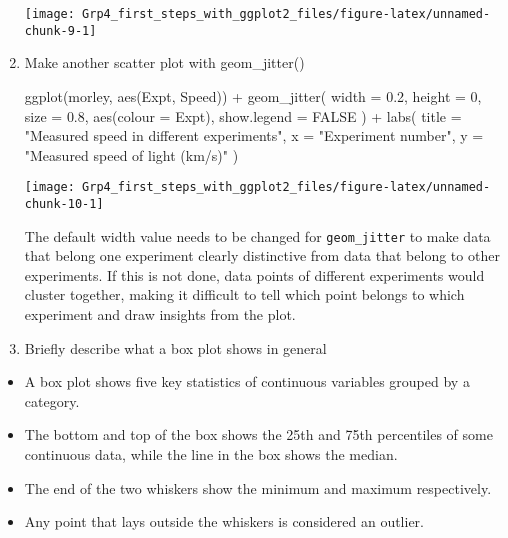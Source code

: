 \documentclass[
]{article}
\newenvironment{Shaded}{\begin{snugshade}}{\end{snugshade}}
\newcommand{\AttributeTok}[1]{\textcolor[rgb]{0.77,0.63,0.00}{#1}}
\newcommand{\ConstantTok}[1]{\textcolor[rgb]{0.00,0.00,0.00}{#1}}
\newcommand{\DecValTok}[1]{\textcolor[rgb]{0.00,0.00,0.81}{#1}}
\newcommand{\FloatTok}[1]{\textcolor[rgb]{0.00,0.00,0.81}{#1}}
\newcommand{\FunctionTok}[1]{\textcolor[rgb]{0.00,0.00,0.00}{#1}}
\newcommand{\NormalTok}[1]{#1}
\newcommand{\SpecialCharTok}[1]{\textcolor[rgb]{0.00,0.00,0.00}{#1}}
\newcommand{\StringTok}[1]{\textcolor[rgb]{0.31,0.60,0.02}{#1}}
\providecommand{\tightlist}{%
  \setlength{\itemsep}{0pt}\setlength{\parskip}{0pt}}
\begin{document}
\begin{enumerate}
  \begin{center}\texttt{[image: Grp4\_first\_steps\_with\_ggplot2\_files/figure-latex/unnamed-chunk-9-1]} \end{center}
\item
  Make another scatter plot with geom\_jitter()

\begin{Shaded}
\begin{Highlighting}[]
  \FunctionTok{ggplot}\NormalTok{(morley, }\FunctionTok{aes}\NormalTok{(Expt, Speed)) }\SpecialCharTok{+}
\FunctionTok{geom\_jitter}\NormalTok{(}
  \AttributeTok{width =} \FloatTok{0.2}\NormalTok{,}
  \AttributeTok{height =} \DecValTok{0}\NormalTok{,}
  \AttributeTok{size =} \FloatTok{0.8}\NormalTok{,}
  \FunctionTok{aes}\NormalTok{(}\AttributeTok{colour =}\NormalTok{ Expt),}
  \AttributeTok{show.legend =} \ConstantTok{FALSE}
\NormalTok{) }\SpecialCharTok{+}
\FunctionTok{labs}\NormalTok{(}
  \AttributeTok{title =} \StringTok{"Measured speed in different experiments"}\NormalTok{,}
  \AttributeTok{x =} \StringTok{"Experiment number"}\NormalTok{,}
  \AttributeTok{y =} \StringTok{"Measured speed of light (km/s)"}
\NormalTok{)}
\end{Highlighting}
\end{Shaded}

  \begin{center}\texttt{[image: Grp4\_first\_steps\_with\_ggplot2\_files/figure-latex/unnamed-chunk-10-1]} \end{center}

  The default width value needs to be changed for \texttt{geom\_jitter}
  to make data that belong one experiment clearly distinctive from data
  that belong to other experiments. If this is not done, data points of
  different experiments would cluster together, making it difficult to
  tell which point belongs to which experiment and draw insights from
  the plot.
\item
  Briefly describe what a box plot shows in general
\end{enumerate}

\begin{itemize}
\tightlist
\item
  A box plot shows five key statistics of continuous variables grouped
  by a category.
\item
  The bottom and top of the box shows the 25th and 75th percentiles of
  some continuous data, while the line in the box shows the median.
\item
  The end of the two whiskers show the minimum and maximum respectively.
\item
  Any point that lays outside the whiskers is considered an outlier.
\end{itemize}
\end{document}
